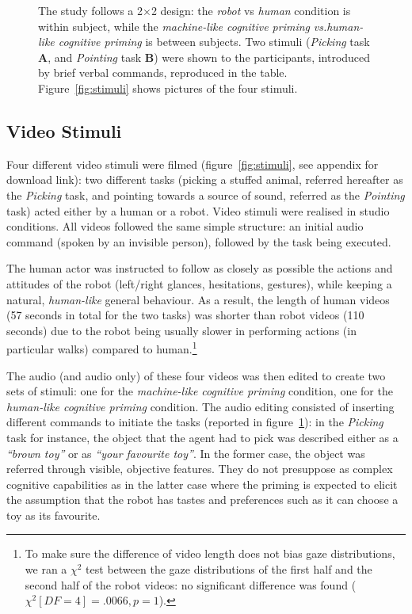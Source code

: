 \documentclass[lettersize, noapacite, twoside, HRI]{apa_HRI}
\newcommand{\vs}{\textit{vs.}\xspace}
\begin{document}
\begin{figure}[ht!]
    \caption{\small The study follows a 2$\times$2 design: the \emph{robot} vs
        \emph{human} condition is within subject, while the \emph{machine-like
        cognitive priming} \vs \emph{human-like cognitive priming} is between subjects.
        Two stimuli (\emph{Picking} task {\bf A}, and \emph{Pointing} task
        {\bf B}) were shown to the participants, introduced by brief verbal
        commands, reproduced in the table. Figure~\ref{fig:stimuli} shows
        pictures of the four stimuli.}

    \label{table:design}
\end{figure}


\subsection{Video Stimuli}

Four different video stimuli were filmed (figure~\ref{fig:stimuli}, see appendix
for download link): two
different tasks (picking a stuffed animal, referred hereafter as the
\emph{Picking} task, and pointing towards a source of sound, referred as the
\emph{Pointing} task) acted either by a human or a robot. Video stimuli were
realised in studio conditions. All videos followed the same simple structure: an
initial audio command (spoken by an invisible person), followed by the task
being executed.

The human actor was instructed to follow as closely as possible the actions and
attitudes of the robot (left/right glances, hesitations, gestures), while keeping a
natural, \emph{human-like} general behaviour. As a result, the length of human videos
(57 seconds in total for the two tasks) was shorter than robot videos (110
seconds) due to the robot being usually slower in performing actions (in
particular walks) compared to human.\footnote{To make sure the difference of
video length does not bias gaze distributions, we ran a $\chi^2$ test between
the gaze distributions of the first half and the second half of the robot
videos: no significant difference was found ($\chi^2[DF=4]=.0066, p=1$).}

The audio (and audio only) of these four videos was then edited to create two
sets of stimuli: one for the \emph{machine-like cognitive priming} condition, one for
the \emph{human-like cognitive priming} condition. The audio editing consisted of 
inserting different commands to initiate the tasks (reported in
figure~\ref{table:design}): in the \emph{Picking} task for instance, the object
that the agent had to pick was described either as a \emph{``brown toy''} or as
\emph{``your favourite toy''}. In the former case, the object was referred through
visible, objective features. They do not presuppose as complex cognitive capabilities
as in the latter case where the priming is expected to elicit the assumption
that the robot has tastes and preferences such as it can choose a toy as its favourite.
\end{document}
